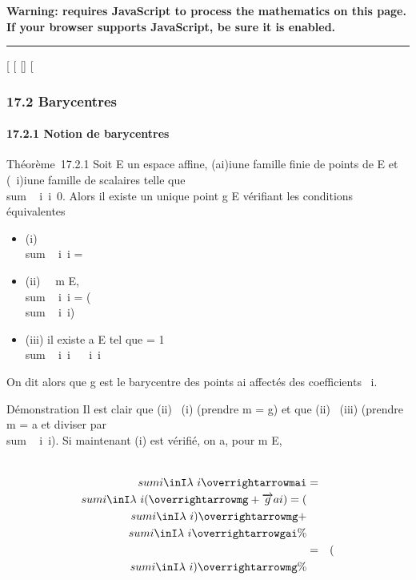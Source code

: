 \textbf{Warning: 
requires JavaScript to process the mathematics on this page.\\ If your
browser supports JavaScript, be sure it is enabled.}

\begin{center}\rule{3in}{0.4pt}\end{center}

{[}
{[}
{[}{]}
{[}

\subsubsection{17.2 Barycentres}

\paragraph{17.2.1 Notion de barycentres}

Théorème~17.2.1 Soit E un espace affine, (ai)i\inI une
famille finie de points de E et (\lambda~i)i\inI une famille
de scalaires telle que
\\sum ~
i\inI\lambda~i\neq~0. Alors il existe un
unique point g \in E vérifiant les conditions équivalentes

\begin{itemize}
\itemsep1pt\parskip0pt
\item
  (i) \\sum ~
  i\inI\lambda~i\overrightarrowgai
  =
\item
  (ii) \forall~~m \in E,
  \\sum ~
  i\inI\lambda~i\overrightarrowmai
  = (\\sum ~
  i\inI\lambda~i)\overrightarrowmg
\item
  (iii) il existe a \in E tel que \overrightarrowag =
  1 \over
  \\sum ~
  i\inI\lambda~i \
  \sum ~
  i\inI\lambda~i\overrightarrowaai
\end{itemize}

On dit alors que g est le barycentre des points ai affectés
des coefficients \lambda~i.

Démonstration Il est clair que (ii) \rigtharrow~(i) (prendre m = g) et que (ii)
\rigtharrow~(iii) (prendre m = a et diviser par
\\sum ~
i\inI\lambda~i). Si maintenant (i) est vérifié, on a, pour m \in
E,

\begin{align*} \\sum
i\inI\lambda~i\overrightarrowmai&
=& \\sum
i\inI\lambda~i(\overrightarrowmg
+\overrightarrow gai) =
(\\sum
i\inI\lambda~i)\overrightarrowmg +
\\sum
i\inI\lambda~i\overrightarrowgai\%&
\\ & =& (\\sum
i\inI\lambda~i)\overrightarrowmg \%&
\\ \end{align*}

